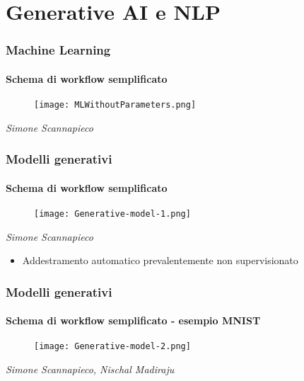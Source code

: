 \section{Generative AI e NLP}
\label{sec:genai_nlp}
%
\begin{frame}[t] \frametitle{Machine Learning}
\framesubtitle{Schema di workflow semplificato}
	\begin{minipage}[t]{\textwidth}
		\vspace{-.7cm}
		\begin{figure}
			\centering
			\texttt{[image: MLWithoutParameters.png]}
		\end{figure}
        \begin{flushright}
            \vspace*{-10pt}
            {\tiny\textit{\textcopyright Simone Scannapieco}}
        \end{flushright}
	\end{minipage}
\end{frame}
%
\begin{frame}[t] \frametitle{Modelli generativi}
\framesubtitle{Schema di workflow semplificato}
	\begin{minipage}[t]{\textwidth}
		\vspace{-.7cm}
		\begin{figure}
			\centering
			\texttt{[image: Generative-model-1.png]}
		\end{figure}
        \begin{flushright}
            \vspace*{-10pt}
            {\tiny\textit{\textcopyright Simone Scannapieco}}
        \end{flushright}
		\vspace{-.3cm}
		\begin{itemize}[leftmargin=10pt,align=right]
			\item[\alert{\faArrowCircleRight}] Addestramento automatico prevalentemente \alert{non supervisionato}
		\end{itemize}
	\end{minipage}
\end{frame}
%
\begin{frame}[t] \frametitle{Modelli generativi}
\framesubtitle{Schema di workflow semplificato - esempio MNIST}
{\footnotesize
	\begin{minipage}[t]{\textwidth}
		\vspace{-.7cm}
		\begin{figure}
			\centering
			\texttt{[image: Generative-model-2.png]}
		\end{figure}
		\begin{flushright}
			 \vspace*{-10pt}
            {\tiny\textit{\textcopyright Simone Scannapieco, Nischal Madiraju}}
		\end{flushright}
	\end{minipage}
}
\end{frame}
